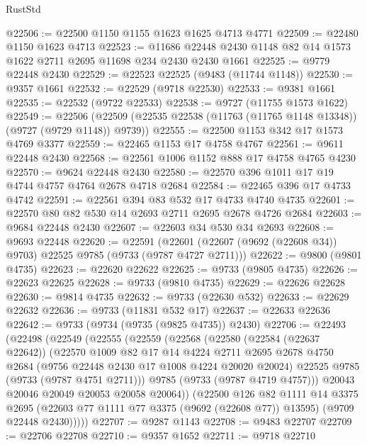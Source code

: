 \begin{lexlean}{RustStd}
\begin{coremodule}
{\begin{coremodule}
{{{{{{{{{{{{{{{{{{{{{{{{{{{{{{{{{{{{{{{{{{{{{{{{{{{{{{{@22506 := @22500 @1150 @1155 @1623 @1625 @4713 @4771
@22509 := @22480 @1150 @1623 @4713
@22523 := @11686 @22448 @2430 @1148 @82 @14 @1573 @1622 @2711 @2695 @11698 @234 @2430 @2430 @1661
@22525 := @9779 @22448 @2430
@22529 := @22523 @22525 (@9483 (@11744 @1148))
@22530 := @9357 @1661
@22532 := @22529 (@9718 @22530)
@22533 := @9381 @1661
@22535 := @22532 (@9722 @22533)
@22538 := @9727 (@11755 @1573 @1622)
@22549 := @22506 (@22509 (@22535 @22538 (@11763 (@11765 @1148 @13348)) (@9727 (@9729 @1148)) @9739))
@22555 := @22500 @1153 @342 @17 @1573 @4769 @3377
@22559 := @22465 @1153 @17 @4758 @4767
@22561 := @9611 @22448 @2430
@22568 := @22561 @1006 @1152 @888 @17 @4758 @4765 @4230
@22570 := @9624 @22448 @2430
@22580 := @22570 @396 @1011 @17 @19 @4744 @4757 @4764 @2678 @4718 @2684
@22584 := @22465 @396 @17 @4733 @4742
@22591 := @22561 @394 @83 @532 @17 @4733 @4740 @4735
@22601 := @22570 @80 @82 @530 @14 @2693 @2711 @2695 @2678 @4726 @2684
@22603 := @9684 @22448 @2430
@22607 := @22603 @34 @530 @34 @2693
@22608 := @9693 @22448
@22620 := @22591
    (@22601 (@22607 (@9692 (@22608 @34)) @9703) @22525 @9785 (@9733 (@9787 @4727 @2711)))
@22622 := @9800 (@9801 @4735)
@22623 := @22620 @22622
@22625 := @9733 (@9805 @4735)
@22626 := @22623 @22625
@22628 := @9733 (@9810 @4735)
@22629 := @22626 @22628
@22630 := @9814 @4735
@22632 := @9733 (@22630 @532)
@22633 := @22629 @22632
@22636 := @9733 (@11831 @532 @17)
@22637 := @22633 @22636
@22642 := @9733 (@9734 (@9735 (@9825 @4735)) @2430)
@22706 := @22493
    (@22498
      (@22549
        (@22555
          (@22559
            (@22568
              (@22580
                (@22584 (@22637 @22642))
                (@22570
                  @1009
                  @82
                  @17
                  @14
                  @4224
                  @2711
                  @2695
                  @2678
                  @4750
                  @2684
                  (@9756 @22448 @2430 @17 @1008 @4224 @20020 @20024)
                  @22525
                  @9785
                  (@9733 (@9787 @4751 @2711)))
                @9785
                (@9733 (@9787 @4719 @4757)))
              @20043
              @20046
              @20049
              @20053
              @20058
              @20064))
          (@22500
            @126
            @82
            @1111
            @14
            @3375
            @2695
            (@22603 @77 @1111 @77 @3375 (@9692 (@22608 @77)) @13595)
            (@9709 @22448 @2430)))))
@22707 := @9287 @1143
@22708 := @9483 @22707
@22709 := @22706 @22708
@22710 := @9357 @1652
@22711 := @9718 @22710
}}}}}}}}}}}}}}}}}}}}}}}}}}}}}}}}}}}}}}}}}}}}}}}}}}}}}}}
\end{coremodule}}
\end{coremodule}
\end{lexlean}

